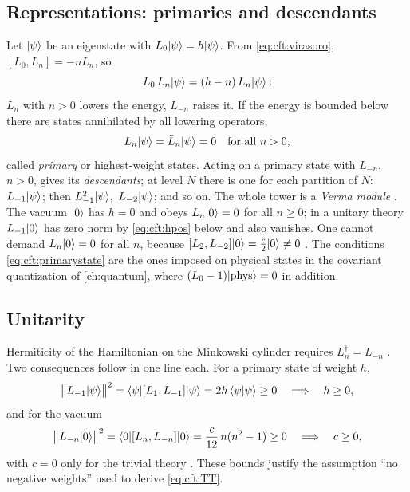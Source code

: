 \subsection{Representations: primaries and descendants}\label{sec:cft:reps}

Let $|\psi\rangle$ be an eigenstate with $L_0|\psi\rangle=h|\psi\rangle$. From \eqref{eq:cft:virasoro},
$[L_0,L_n]=-nL_n$, so
\begin{equation}\label{eq:cft:ladder}
  L_0\,L_n|\psi\rangle=(h-n)\,L_n|\psi\rangle :
\end{equation}
$L_n$ with $n>0$ lowers the energy, $L_{-n}$ raises it. If the energy is bounded below there are
states annihilated by all lowering operators,
\begin{equation}\label{eq:cft:primarystate}
  L_n|\psi\rangle=\tilde L_n|\psi\rangle=0\quad\text{for all }n>0,
\end{equation}
called \emph{primary} or highest-weight states. Acting on a primary state
with $L_{-n}$, $n>0$, gives its \emph{descendants}; at level $N$ there is one
for each partition of $N$: $L_{-1}|\psi\rangle$; then $L_{-1}^2|\psi\rangle,\ L_{-2}|\psi\rangle$; and so
on. The whole tower is a \emph{Verma module}
. The vacuum $|0\rangle$ has $h=0$ and obeys
$L_n|0\rangle=0$ for all $n\ge0$; in a unitary theory $L_{-1}|0\rangle$ has zero norm by
\eqref{eq:cft:hpos} below and also vanishes. One cannot demand $L_n|0\rangle=0$ for all $n$, because
$[L_2,L_{-2}]|0\rangle=\frac c2|0\rangle\ne0$
. The conditions \eqref{eq:cft:primarystate} are the ones
imposed on physical states in the covariant quantization of \cref{ch:quantum}, where
$(L_0-1)|\rm phys\rangle=0$ in addition.

\subsection{Unitarity}\label{sec:cft:unitarity}

Hermiticity of the Hamiltonian on the Minkowski cylinder requires $L_n^\dagger=L_{-n}$
. Two consequences follow in one line each. For a primary
state of weight $h$,
\begin{equation}\label{eq:cft:hpos}
  \big\|L_{-1}|\psi\rangle\big\|^2=\langle \psi|[L_1,L_{-1}]|\psi\rangle=2h\,\langle \psi|\psi\rangle\ge0
  \quad\Longrightarrow\quad h\ge0,
\end{equation}
and for the vacuum
\begin{equation}\label{eq:cft:cpos}
  \big\|L_{-n}|0\rangle\big\|^2=\langle 0|[L_n,L_{-n}]|0\rangle=\frac{c}{12}\,n(n^2-1)\ge0
  \quad\Longrightarrow\quad c\ge0 ,
\end{equation}
with $c=0$ only for the trivial theory . These bounds
justify the assumption ``no negative weights'' used to derive \eqref{eq:cft:TT}.


